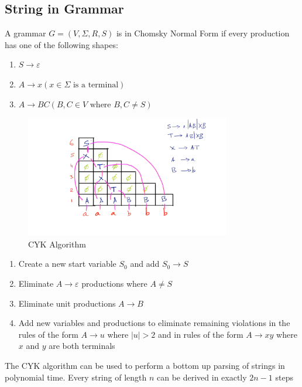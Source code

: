 \documentclass[a4paper]{article}
\theoremstyle{plain}
\theoremstyle{definition}
\newtheorem{defn}{Definition}[section]
\newtheorem{exmp}{Example}[section]
\theoremstyle{remark}
\begin{document}
\subsection{String in Grammar}
\begin{tcolorbox}[colback=black!3!white,colframe=black!60!white,title=\begin{defn}Cocke-Younger-Kasami \label{Cocke-Younger-Kasami}\end{defn}]
A grammar $G=(V,\Sigma,R,S)$ is in Chomsky Normal Form if every production has one of the following shapes:
\begin{enumerate}
	\item $S \to \varepsilon$ 
	\item $A \to x (x \in \Sigma \text{ is a terminal})$
	\item $A \to BC (B,C\in V\text{ where } B,C \neq S)$
\end{enumerate}
\end{tcolorbox}
\begin{tcolorbox}[colback=black!3!white,colframe=black!60!white,title=\begin{exmp}CYK Algorithm \label{CYK Algorithm}\end{exmp}]
\begin{figure}[H]
	\centering
	\includegraphics[width=0.8\textwidth]{seventeen.png}
	\caption{CYK Algorithm}
	\label{fig:seventeen-png}
\end{figure}
\end{tcolorbox}
\begin{tcolorbox}[colback=black!3!white,colframe=black!60!white,title=\begin{defn}To Chomsky Normal Form \label{To Chomsky Normal Form}\end{defn}]
\begin{enumerate}
	\item Create a new start variable $S_0$ and add $S_0 \to S$ 
	\item Eliminate $A \to \varepsilon$ productions where $A \neq S$ 
	\item Eliminate unit productions  $A\to B$ 
	\item Add new variables and productions to eliminate remaining violations in the rules of the form $A \to u$ where $|u| > 2$ and in rules of the form $A\to xy$ where $x$ and $y$ are both terminals
\end{enumerate}
The CYK algorithm can be used to perform a bottom up parsing of strings in polynomial time. Every string of length $n$ can be derived in exactly $2n-1$ steps
\end{tcolorbox}
\end{document}
